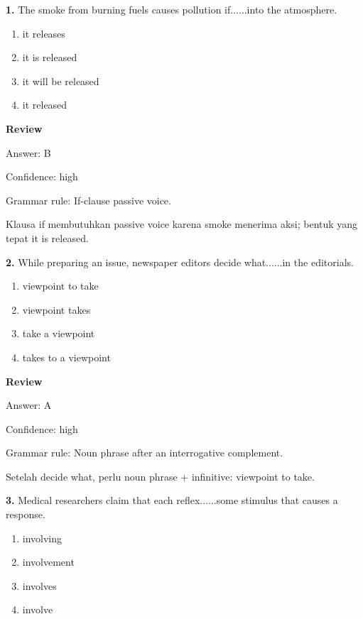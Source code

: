 \documentclass[12pt]{article}
\begin{document}
\noindent\textbf{1.} The smoke from burning fuels causes pollution if......into the atmosphere.
\begin{enumerate}[label=(\Alph*),leftmargin=*,itemsep=0.2em]
\item it releases
\item it is released
\item it will be released
\item it released
\end{enumerate}
\par
\begingroup
\setlength{\parskip}{0pt}
\setlength{\parindent}{0pt}
\textbf{Review}\par
Answer: B\par
Confidence: high\par
Grammar rule: If-clause passive voice.\par
Klausa if membutuhkan passive voice karena smoke menerima aksi; bentuk yang tepat it is released.\par
\endgroup
\par
\vspace{0.25\baselineskip}
\noindent\textbf{2.} While preparing an issue, newspaper editors decide what......in the editorials.
\begin{enumerate}[label=(\Alph*),leftmargin=*,itemsep=0.2em]
\item viewpoint to take
\item viewpoint takes
\item take a viewpoint
\item takes to a viewpoint
\end{enumerate}
\par
\begingroup
\setlength{\parskip}{0pt}
\setlength{\parindent}{0pt}
\textbf{Review}\par
Answer: A\par
Confidence: high\par
Grammar rule: Noun phrase after an interrogative complement.\par
Setelah decide what, perlu noun phrase + infinitive: viewpoint to take.\par
\endgroup
\par
\vspace{0.25\baselineskip}
\noindent\textbf{3.} Medical researchers claim that each reflex......some stimulus that causes a response.
\begin{enumerate}[label=(\Alph*),leftmargin=*,itemsep=0.2em]
\item involving
\item involvement
\item involves
\item involve
\end{enumerate}
\end{document}
